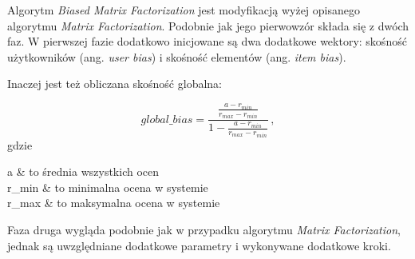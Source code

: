 \documentclass[twoside]{iisthesis}
\begin{document}
	 Algorytm \textit{Biased Matrix Factorization} jest modyfikacją wyżej opisanego algorytmu \textit{Matrix Factorization}. Podobnie jak jego pierwowzór składa się z dwóch faz. W pierwszej fazie dodatkowo inicjowane są dwa dodatkowe wektory: skośność użytkowników (ang. \textit{user bias}) i skośność elementów (ang. \textit{item bias}). 
	 
	 Inaczej jest też obliczana skośność globalna: 
	 
	 \begin{equation}
	 \label{eq:global_bias}
	 global\_bias = 
	 \frac
	 { 
	 	\frac{ a - r_{min} }{ r_{max} - r_{min} }
	 }
	 {
	 	1 - \frac{ a - r_{min} }{ r_{max} - r_{min} }	
	 }
	 \,,
	 \end{equation} 		 		
	 gdzie
	 
	 \begin{conditions*}
	 	a & to średnia wszystkich ocen \\
	 	r_{min}  &  to minimalna ocena w systemie  \\
	 	r_{max}  &  to maksymalna ocena w systemie
	 \end{conditions*} 
	 
	 Faza druga wygląda podobnie jak w przypadku algorytmu \textit{Matrix Factorization}, jednak są uwzględniane dodatkowe parametry i wykonywane dodatkowe kroki.
	 
\end{document}
